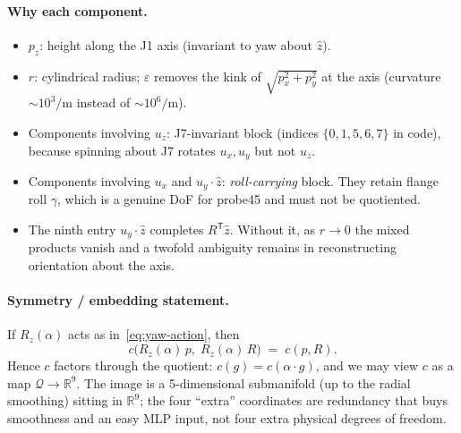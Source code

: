 \documentclass[11pt,a4paper]{article}
\newcommand{\R}{\mathbb{R}}
\begin{document}
\paragraph{Why each component.}
\begin{itemize}[leftmargin=1.4em]
  \item \(p_{z}\): height along the J1 axis (invariant to yaw about \(\hat z\)).
  \item \(r\): cylindrical radius; \(\varepsilon\) removes the kink of
        \(\sqrt{p_{x}^{2}+p_{y}^{2}}\) at the axis (curvature \(\sim 10^{3}/\mathrm{m}\)
        instead of \(\sim 10^{6}/\mathrm{m}\)).
  \item Components involving \(u_{z}\): J7-invariant block
        (indices \(\{0,1,5,6,7\}\) in code), because spinning about J7 rotates
        \(u_{x},u_{y}\) but not \(u_{z}\).
  \item Components involving \(u_{x}\) and \(u_{y}\!\cdot\!\hat z\):
        \emph{roll-carrying} block. They retain flange roll \(\gamma\), which
        is a genuine DoF for probe45 and must not be quotiented.
  \item The ninth entry \(u_{y}\!\cdot\!\hat z\) completes \(R^{\mathsf T}\hat z\).
        Without it, as \(r\to 0\) the mixed products vanish and a twofold
        ambiguity remains in reconstructing orientation about the axis.
\end{itemize}

\paragraph{Symmetry / embedding statement.}
If \(R_{z}(\alpha)\) acts as in~\eqref{eq:yaw-action}, then
\begin{equation}
\label{eq:yaw-invariance}
  c\bigl(R_{z}(\alpha)\,p,\; R_{z}(\alpha)\,R\bigr)
  \;=\;
  c(p,R).
\end{equation}
Hence \(c\) factors through the quotient:
\(c(g)=c(\alpha\cdot g)\), and we may view \(c\) as a map
\(\mathcal{Q}\to\R^{9}\). The image is a 5-dimensional submanifold (up to the
radial smoothing) sitting in \(\R^{9}\); the four ``extra'' coordinates are
redundancy that buys smoothness and an easy MLP input, not four extra
physical degrees of freedom.
\end{document}
